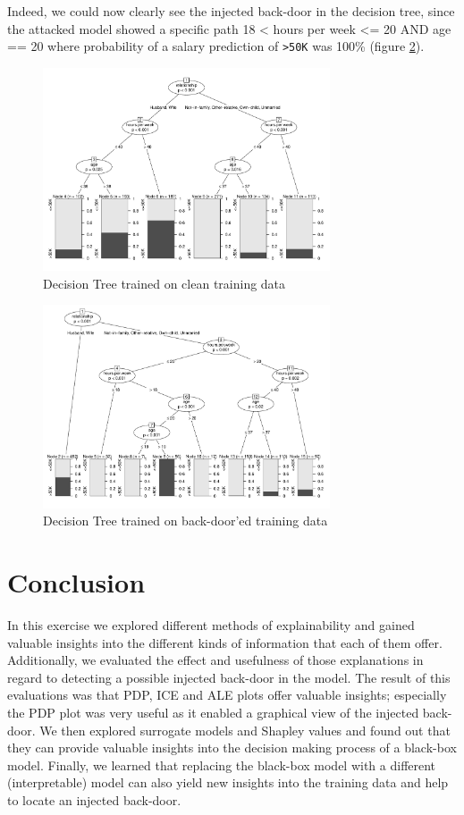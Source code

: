 \documentclass[sigconf,nonacm]{acmart}
\begin{document}
Indeed, we could now clearly see the injected back-door in the decision
tree, since the attacked model showed a specific path 18 \textless{}
hours per week \textless= 20 AND age == 20 where probability of a salary
prediction of \texttt{\textgreater{}50K} was 100\% (figure
\ref{fig:dtree:dirty}).

\begin{figure}
    \includegraphics[width=8.5cm]{decisionTreeClean.pdf}
    \caption{Decision Tree trained on clean training data}
    \label{fig:dtree:clean}
\end{figure}

\begin{figure}
    \includegraphics[width=8.5cm]{decisionTreeDirty.pdf}
    \caption{Decision Tree trained on back-door'ed training data}
    \label{fig:dtree:dirty}
\end{figure}

\hypertarget{conclusion}{%
\section{Conclusion}\label{conclusion}}

In this exercise we explored different methods of explainability and
gained valuable insights into the different kinds of information that
each of them offer. Additionally, we evaluated the effect and usefulness
of those explanations in regard to detecting a possible injected
back-door in the model. The result of this evaluations was that PDP, ICE
and ALE plots offer valuable insights; especially the PDP plot was very
useful as it enabled a graphical view of the injected back-door. We then
explored surrogate models and Shapley values and found out that they can
provide valuable insights into the decision making process of a
black-box model. Finally, we learned that replacing the black-box model
with a different (interpretable) model can also yield new insights into
the training data and help to locate an injected back-door.



\end{document}
